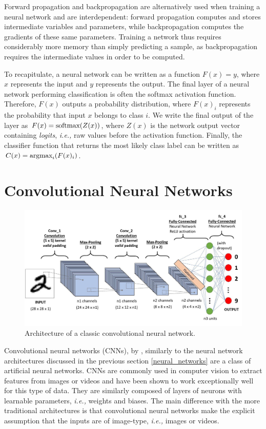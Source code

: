 Forward propagation and backpropagation are alternatively used when training a
neural network and are interdependent: forward propagation computes and stores
intermediate variables and parameters, while backpropagation computes the
gradients of these same parameters. Training a network thus requires
considerably more memory than simply predicting a sample, as backpropagation
requires the intermediate values in order to be computed.

To recapitulate, a neural network can be written as a function $F(x)=y$, where
$x$ represents the input and $y$ represents the output. The final layer of a
neural network performing classification is often the softmax activation
function. Therefore, $F(x)$ outputs a probability distribution, where $F(x)_{i}$
represents the probability that input $x$ belongs to class $i$. We write the
final output of the layer as $F(x)=\textup{softmax}(Z(x))$, where $Z(x)$ is the
network output vector containing \textit{logits}, \emph{i.e.,} raw values before
the activation function. Finally, the classifier function that returns the most
likely class label can be written as $C(x)=\textup{argmax}_{i}{(F(x)_{i})}$.

\section{Convolutional Neural Networks}
\label{CNNs}

\begin{figure}[ht]
    \includegraphics[clip,width=1\columnwidth]{Figures/related/cnn.jpeg}
    \caption{ Architecture of a classic convolutional neural network. }
    \label{fig:cnn}
\end{figure}

Convolutional neural networks (CNNs), by \cite{lecun_object_1999}, similarly to
the neural network architectures discussed in the previous section
\ref{neural_networks} are a class of artificial neural networks. CNNs are
commonly used in computer vision to extract features from images or videos and
have been shown to work exceptionally well for this type of data. They are
similarly composed of layers of neurons with learnable parameters, \emph{i.e.,}
weights and biases. The main difference with the more traditional architectures
is that convolutional neural networks make the explicit assumption that the
inputs are of image-type, \emph{i.e.,} images or videos.

